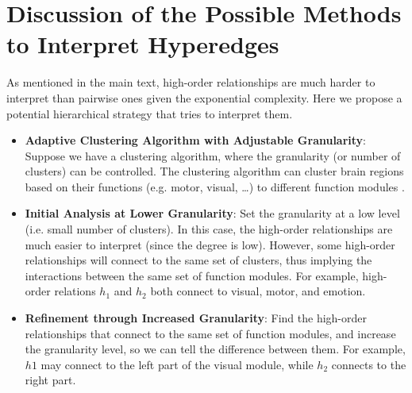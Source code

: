 

\section{Discussion of the Possible Methods to Interpret Hyperedges}
\label{app:interpret}
As mentioned in the main text, high-order relationships are much harder to interpret than pairwise ones given the exponential complexity. Here we propose a potential hierarchical strategy that tries to interpret them.

\begin{itemize}
    \item  \textbf{Adaptive Clustering Algorithm with Adjustable Granularity}: Suppose we have a clustering algorithm, where the granularity (or number of clusters) can be controlled. The clustering algorithm can cluster brain regions based on their functions (e.g. motor, visual, …) to different function modules \cite{shen2010graph}.
    \item   \textbf{Initial Analysis at Lower Granularity}: Set the granularity at a low level (i.e. small number of clusters). In this case, the high-order relationships are much easier to interpret (since the degree is low). However, some high-order relationships will connect to the same set of clusters, thus implying the interactions between the same set of function modules. For example, high-order relations $h_1$ and $h_2$ both connect to visual, motor, and emotion.
    \item \textbf{Refinement through Increased Granularity}: Find the high-order relationships that connect to the same set of function modules, and increase the granularity level, so we can tell the difference between them. For example, $h1$ may connect to the left part of the visual module, while $h_2$ connects to the right part.
\end{itemize}